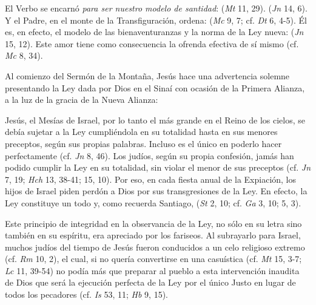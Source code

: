 
\begin{ccebody}
 El Verbo se encarnó \textit{para ser nuestro modelo de santidad}:  (\textit{Mt} 11, 29).  (\textit{Jn} 14, 6). Y el Padre, en el monte de la Transfiguración, ordena:  (\textit{Mc} 9, 7; cf. \textit{Dt} 6, 4-5). Él es, en efecto, el modelo de las bienaventuranzas y la norma de la Ley nueva:  (\textit{Jn} 15, 12). Este amor tiene como consecuencia la ofrenda efectiva de sí mismo (cf. \textit{Mc} 8, 34).


 Al comienzo del Sermón de la Montaña, Jesús hace una advertencia solemne presentando la Ley dada por Dios en el Sinaí con ocasión de la Primera Alianza, a la luz de la gracia de la Nueva Alianza:


 Jesús, el Mesías de Israel, por lo tanto el más grande en el Reino de los cielos, se debía sujetar a la Ley cumpliéndola en su totalidad hasta en sus menores preceptos, según sus propias palabras. Incluso es el único en poderlo hacer perfectamente (cf. \textit{Jn} 8, 46). Los judíos, según su propia confesión, jamás han podido cumplir la Ley en su totalidad, sin violar el menor de sus preceptos (cf. \textit{Jn} 7, 19; \textit{Hch} 13, 38-41; 15, 10). Por eso, en cada fiesta anual de la Expiación, los hijos de Israel piden perdón a Dios por sus transgresiones de la Ley. En efecto, la Ley constituye un todo y, como recuerda Santiago,  (\textit{St} 2, 10; cf. \textit{Ga} 3, 10; 5, 3).

 Este principio de integridad en la observancia de la Ley, no sólo en su letra sino también en su espíritu, era apreciado por los fariseos. Al subrayarlo para Israel, muchos judíos del tiempo de Jesús fueron conducidos a un celo religioso extremo (cf. \textit{Rm} 10, 2), el cual, si no quería convertirse en una casuística  (cf. \textit{Mt} 15, 3-7; \textit{Lc} 11, 39-54) no podía más que preparar al pueblo a esta intervención inaudita de Dios que será la ejecución perfecta de la Ley por el único Justo en lugar de todos los pecadores (cf. \textit{Is} 53, 11; \textit{Hb} 9, 15).


\end{ccebody}
